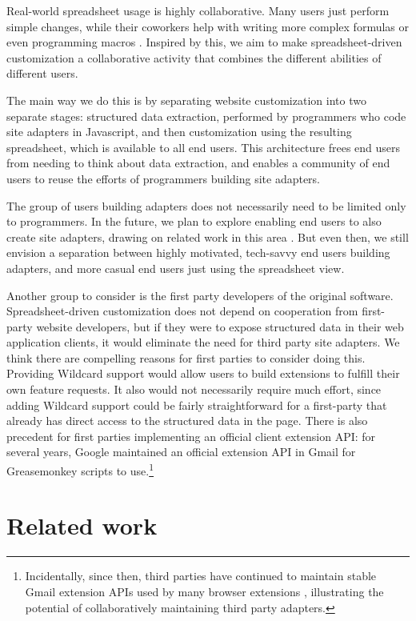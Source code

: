 \documentclass[english,submission]{programming}
\begin{document}
Real-world spreadsheet usage is highly collaborative. Many users just
perform simple changes, while their coworkers help with writing more
complex formulas or even programming macros \autocite{nardi1990}.
Inspired by this, we aim to make spreadsheet-driven customization a
collaborative activity that combines the different abilities of
different users.

The main way we do this is by separating website customization into two
separate stages: structured data extraction, performed by programmers
who code site adapters in Javascript, and then customization using the
resulting spreadsheet, which is available to all end users. This
architecture frees end users from needing to think about data
extraction, and enables a community of end users to reuse the efforts of
programmers building site adapters.

The group of users building adapters does not necessarily need to be
limited only to programmers. In the future, we plan to explore enabling
end users to also create site adapters, drawing on related work in this
area \autocite{chasins2018,huynh2006}. But even then, we still envision
a separation between highly motivated, tech-savvy end users building
adapters, and more casual end users just using the spreadsheet view.

Another group to consider is the first party developers of the original
software. Spreadsheet-driven customization does not depend on
cooperation from first-party website developers, but if they were to
expose structured data in their web application clients, it would
eliminate the need for third party site adapters. We think there are
compelling reasons for first parties to consider doing this. Providing
Wildcard support would allow users to build extensions to fulfill their
own feature requests. It also would not necessarily require much effort,
since adding Wildcard support could be fairly straightforward for a
first-party that already has direct access to the structured data in the
page. There is also precedent for first parties implementing an official
client extension API: for several years, Google maintained an official
extension API in Gmail for Greasemonkey scripts to use.\footnote{Incidentally,
  since then, third parties have continued to maintain stable Gmail
  extension APIs used by many browser extensions
  \autocite{streak,talwar2019}, illustrating the potential of
  collaboratively maintaining third party adapters.}

\hypertarget{sec:related-work}{%
\section{Related work}\label{sec:related-work}}
\end{document}
